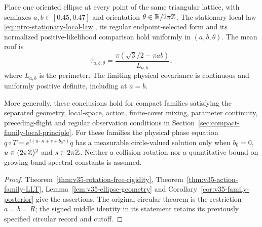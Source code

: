 \begin{leadtheorem}
\label{thm:intro-action-family}
Place one oriented ellipse at every point of the same triangular lattice,
with semiaxes $a,b\in[0.45,0.47]$ and orientation $\theta\in\mathbb R/2\pi\mathbb Z$.
The stationary local law \eqref{eq:intro-stationary-local-law}, its regular
endpoint-selected form and its normalized positive-likelihood comparison
hold uniformly in $(a,b,\theta)$. The mean roof is
\[
 \bar\tau_{a,b,\theta}=\frac{\pi(\sqrt3/2-\pi ab)}{L_{a,b}},
\]
where $L_{a,b}$ is the perimeter. The limiting physical covariance is
continuous and uniformly positive definite, including at $a=b$.

More generally, these conclusions hold for compact families satisfying
the separated geometry, local-space, action, finite-cover mixing,
parameter continuity, preceding-flight and regular observation conditions in Section~\ref{sec:compact-family-local-principle}.
For these families the physical phase equation
$q\circ T=e^{i(u\cdot\kappa+s+b_0\tau)}q$ has a measurable circle-valued
solution only when $b_0=0$, $u\in(2\pi\mathbb Z)^2$ and $s\in2\pi\mathbb Z$.
Neither a collision rotation nor a quantitative bound on growing-band
spectral constants is assumed.
\end{leadtheorem}
\begin{proof}
Theorem~\ref{thm:v35-rotation-free-rigidity},
Theorem~\ref{thm:v35-action-family-LLT},
Lemma~\ref{lem:v35-ellipse-geometry} and
Corollary~\ref{cor:v35-family-posterior} give the assertions.
The original circular theorem is the restriction $a=b=R$; the signed
middle identity in its statement retains its previously specified
circular record and cutoff.
\end{proof}


